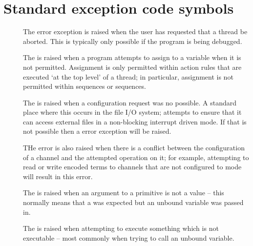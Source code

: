 \section{Standard exception code symbols}

\begin{description}

\item[]
\label{eABORT}

The  error exception is raised when the user has requested that a thread be aborted. This is typically only possible if the program is being debugged.

\item[]
\label{eASSIGN}
  
The  is raised when a program attempts to assign to a variable when it is not permitted. Assignment is only permitted within action rules that are executed `at the top level' of a thread; in particular, assignment is not permitted within  sequences or  sequences. 

\item[]
\label{eCFGERR}
  
The  is raised when a  configuration  request was no possible. A standard place where this occurs in the file I/O system; \go attempts to ensure that it can access external files in a non-blocking interrupt driven mode. If that is not possible then a  error exception will be raised.

THe  error is also raised when there is a conflict between the configuration of a channel and the attempted operation on it; for example, attempting to read or write encoded terms to channels that are not configured to  mode will result in this error.

\item[]
\label{eCHRNEEDD}
  
The  is raised when an argument to a primitive is not a  value -- this normally means that a  was expected but an unbound variable was passed in. 
  
\item[]
\label{eCODE}
  
The  is raised when attempting to execute something which is not executable -- most commonly when trying to call an unbound variable.
  

\end{description}
